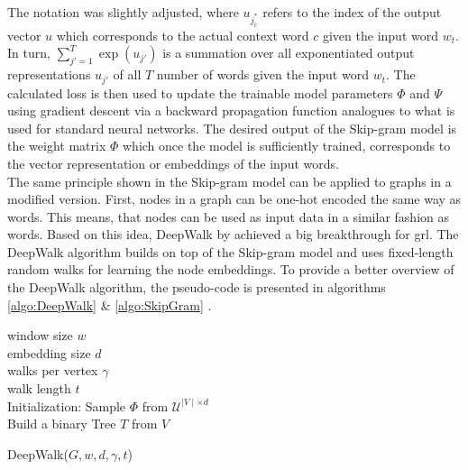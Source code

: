 	\noindent The notation was slightly adjusted, where $u_{j_{c}^{*}}$ refers
	to the index of the output vector $u$ which corresponds to the actual
	context word $c$ given the input word $w_{t}$. In turn, 
	$\sum_{j'=1}^{T}\exp(u_{j'})$ is a summation over all exponentiated output 
	representations $u_{j'}$ of all $T$ number of words given the input word 
	$w_{t}$. The calculated loss is then used to update the trainable model 
	parameters $\Phi$ and $\Psi$ using gradient descent via a backward 
	propagation function \citep{werbos1974beyond} analogues to what is used for 
	standard neural networks. The desired output of the Skip-gram model is the 
	weight matrix $\Phi$ which once the model is sufficiently trained, 
	corresponds to the
	vector representation or embeddings of the input words. \\

	\noindent The same principle shown in the Skip-gram model can be applied
	to graphs in a modified version. First, nodes in a graph can be one-hot
	encoded the same way as words. This means, that nodes can be used as input
	data in a similar fashion as words. Based on this idea, DeepWalk by
	\cite{perozzi2014deepwalk} achieved a big breakthrough for \acs{grl}. The 
	DeepWalk algorithm builds on top of the Skip-gram model and uses 
	fixed-length random walks for learning the node embeddings. To provide a 
	better overview of the DeepWalk algorithm, the pseudo-code is presented in 
	algorithms \ref{algo:DeepWalk} \& \ref{algo:SkipGram} 
	\citep[p. 704]{perozzi2014deepwalk}.
	
	\begin{algorithm}[h]
		\scriptsize
		\SetAlgoLined
		window size $w$\\
		embedding size $d$\\
		walks per vertex $\gamma$\\
		walk length $t$\\
		\nl Initialization: Sample $\Phi$ from $\mathcal{U}^{\mid V
		\mid \times d}$ \\
		\nl Build a binary Tree $T$ from $V$ \\
		\nl {}
		\caption[DeepWalk]{DeepWalk($G,w,d,\gamma,t$)}
		\label{algo:DeepWalk}
	\end{algorithm}
	
